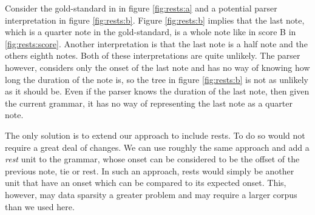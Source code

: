 Consider the gold-standard in in figure \ref{fig:rests:a} and a potential parser interpretation in figure \ref{fig:rests:b}. Figure \ref{fig:rests:b} implies that the last note, which is a quarter note in the gold-standard, is a whole note like in score B in \ref{fig:rests:score}. Another interpretation is that the last note is a half note and the others eighth notes. Both of these interpretations are quite unlikely. The parser however, considers only the onset of the last note and has no way of knowing how long the duration of the note is, so the tree in figure \ref{fig:rests:b} is not as unlikely as it should be. Even if the parser knows the duration of the last note, then given the current grammar, it has no way of representing the last note as a quarter note. 

The only solution is to extend our approach to include rests. To do so would not require a great deal of changes. We can use roughly the same approach and add a \textit{rest} unit to the grammar, whose onset can be considered to be the offset of the previous note, tie or rest. In such an approach, rests would simply be another unit that have an onset which can be compared to its expected onset. This, however, may data sparsity a greater problem and may require a larger corpus than we used here.

